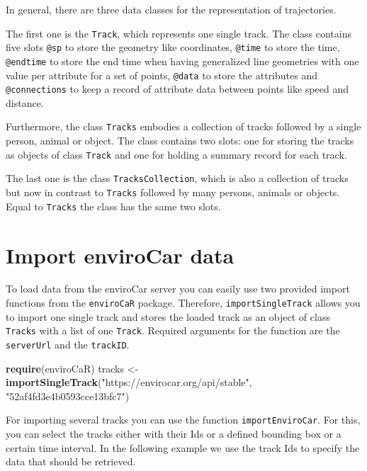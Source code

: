 \documentclass[]{article}
\newenvironment{Shaded}{\begin{snugshade}}{\end{snugshade}}
\newcommand{\KeywordTok}[1]{\textcolor[rgb]{0.13,0.29,0.53}{\textbf{{#1}}}}
\newcommand{\StringTok}[1]{\textcolor[rgb]{0.31,0.60,0.02}{{#1}}}
\newcommand{\NormalTok}[1]{{#1}}
\begin{document}
In general, there are three data classes for the representation of
trajectories.

The first one is the \texttt{Track}, which represents one single track.
The class contains five slots \texttt{@sp} to store the geometry like
coordinates, \texttt{@time} to store the time, \texttt{@endtime} to
store the end time when having generalized line geometries with one
value per attribute for a set of points, \texttt{@data} to store the
attributes and \texttt{@connections} to keep a record of attribute data
between points like speed and distance.

Furthermore, the class \texttt{Tracks} embodies a collection of tracks
followed by a single person, animal or object. The class contains two
slots: one for storing the tracks as objects of class \texttt{Track} and
one for holding a summary record for each track.

The last one is the class \texttt{TracksCollection}, which is also a
collection of tracks but now in contrast to \texttt{Tracks} followed by
many persons, animals or objects. Equal to \texttt{Tracks} the class has
the same two slots.

\section{Import enviroCar data}\label{import-envirocar-data}

To load data from the enviroCar server you can easily use two provided
import functions from the \texttt{enviroCaR} package. Therefore,
\texttt{importSingleTrack} allows you to import one single track and
stores the loaded track as an object of class \texttt{Tracks} with a
list of one \texttt{Track}. Required arguments for the function are the
\texttt{serverUrl} and the \texttt{trackID}.

\begin{Shaded}
\begin{Highlighting}[]
\KeywordTok{require}\NormalTok{(enviroCaR)}
\NormalTok{tracks <-}\StringTok{ }\KeywordTok{importSingleTrack}\NormalTok{(}\StringTok{"https://envirocar.org/api/stable"}\NormalTok{, }\StringTok{"52af4fd3e4b0593cce13bfc7"}\NormalTok{)}
\end{Highlighting}
\end{Shaded}

For importing several tracks you can use the function
\texttt{importEnviroCar}. For this, you can select the tracks either
with their Ids or a defined bounding box or a certain time interval. In
the following example we use the track Ids to specify the data that
should be retrieved.
\end{document}
